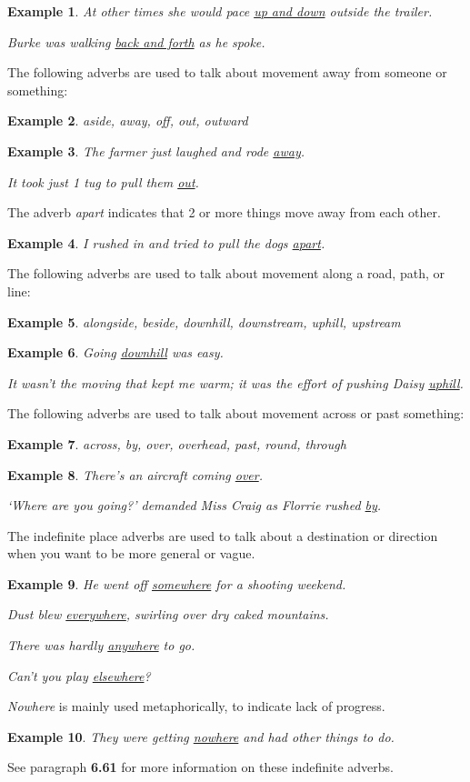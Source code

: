 \documentclass[oneside]{book}
\numberwithin{equation}{section}
\newtheorem{example}{Example}[section]
\begin{document}
\begin{example}
    At other times she would pace \underline{up and down} outside the trailer.
    
    Burke was walking \underline{back and forth} as he spoke.
\end{example}
%
\noindent{} The following adverbs are used to talk about movement away from someone or something:
\begin{example}
    aside, away, off, out, outward
\end{example}

\begin{example}
    The farmer just laughed and rode \underline{away}.
    
    It took just 1 tug to pull them \underline{out}.
\end{example}
The adverb \textit{apart} indicates that 2 or more things move away from each other.
\begin{example}
    I rushed in and tried to pull the dogs \underline{apart}.
\end{example}
%
\noindent{} The following adverbs are used to talk about movement along a road, path, or line:
\begin{example}
    alongside, beside, downhill, downstream, uphill, upstream
\end{example}

\begin{example}
    Going \underline{downhill} was easy.
    
    It wasn't the moving that kept me warm; it was the effort of pushing Daisy \underline{uphill}.
\end{example}
%
\noindent{} The following adverbs are used to talk about movement across or past something:
\begin{example}
    across, by, over, overhead, past, round, through
\end{example}

\begin{example}
    There's an aircraft coming \underline{over}.
    
    `Where are you going?' demanded Miss Craig as Florrie rushed \underline{by}.
\end{example}
%
\noindent{} The indefinite place adverbs are used to talk about a destination or direction when you want to be more general or vague.
\begin{example}
    He went off \underline{somewhere} for a shooting weekend.
    
    Dust blew \underline{everywhere}, swirling over dry caked mountains.
    
    There was hardly \underline{anywhere} to go.
    
    Can't you play \underline{elsewhere}?
\end{example}
\textit{Nowhere} is mainly used metaphorically, to indicate lack of progress.
\begin{example}
    They were getting \underline{nowhere} and had other things to do.
\end{example}
See paragraph \textbf{6.61} for more information on these indefinite adverbs.
\end{document}
